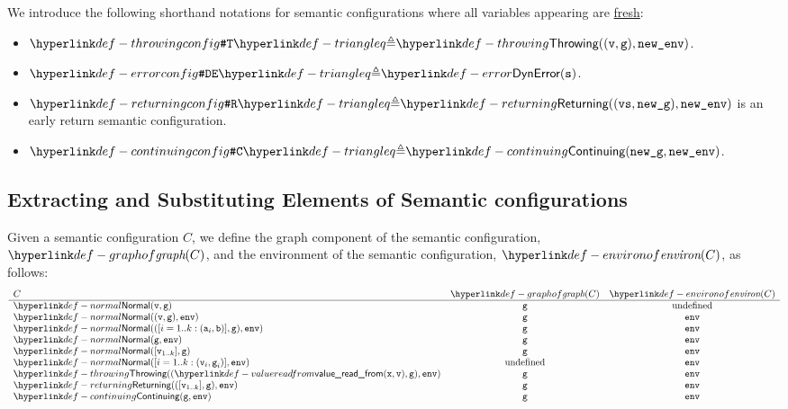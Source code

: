 We introduce the following shorthand notations for semantic configurations where all variables
appearing are \hyperlink{def-freshvariables}{fresh}:
\begin{itemize}
\hypertarget{def-throwingconfig}{}
\item $\ThrowingConfig \triangleq \Throwing((\vv, \vg), \newenv)$.
\hypertarget{def-errorconfig}{}
\item $\DynErrorConfig \triangleq \Error(\vs)$.
\hypertarget{def-returningconfig}{}
\item $\ReturningConfig \triangleq \Returning((\vvs,\newg), \newenv)$
is an early return semantic configuration.
\hypertarget{def-continuingconfig}{}
\item $\ContinuingConfig \triangleq \Continuing(\newg, \newenv)$.
\end{itemize}

\subsection{Extracting and Substituting Elements of Semantic configurations}

\hypertarget{def-graphof}{}
\hypertarget{def-environof}{}
Given a semantic configuration $C$, we define the graph component of the semantic configuration, \\
$\graphof{C}$, and the environment of the semantic configuration, $\environof{C}$, as follows:
\[
\begin{array}{lcc}
  C & \graphof{C} & \environof{C}\\
  \hline
  \Normal(\vv,\vg) & \vg & \text{undefined}\\
  \Normal((\vv,\vg), \env) & \vg & \env\\
  \Normal(([i=1..k: (\va_i,\vb)],\vg), \env) & \vg & \env\\
  \Normal(\vg, \env) & \vg & \env\\
  \Normal([\vv_{1..k}], \vg) & \vg & \env\\
  \Normal([i=1..k: (\vv_i,\vg_i)], \env) & \text{undefined} & \env\\
  \Throwing((\valuereadfrom(\vx,\vv),\vg), \env) & \vg & \env\\
  \Returning(([\vv_{1..k}],\vg), \env) & \vg & \env\\
  \Continuing(\vg, \env) & \vg & \env\\
\end{array}
\]

